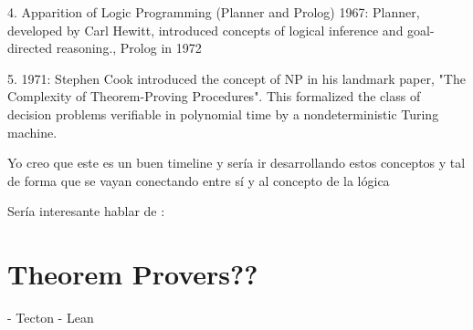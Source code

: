 \documentclass{article}
\begin{document}
4. Apparition of Logic Programming (Planner and Prolog) 
1967: Planner, developed by Carl Hewitt, introduced concepts of logical inference and goal-directed reasoning., Prolog in 1972

5. 1971: Stephen Cook introduced the concept of NP in his landmark paper, "The Complexity of Theorem-Proving Procedures". This formalized the class of decision problems verifiable in polynomial time by a nondeterministic Turing machine.

Yo creo que este es un buen timeline y sería ir desarrollando estos conceptos y tal de forma que se vayan conectando entre sí y al concepto de la lógica



Sería interesante hablar de :


\section{Theorem Provers??}
- Tecton
- Lean



\renewcommand{\refname}{Referencias}


\end{document}
